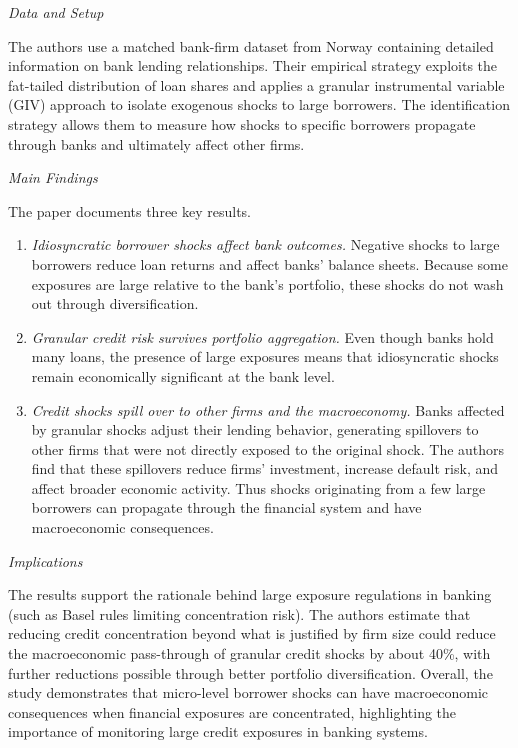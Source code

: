 \documentclass[letterpaper]{article}
\begin{document}
		\textit{Data and Setup}
		
		The authors use a matched bank-firm dataset from Norway containing detailed information on bank lending relationships. Their empirical strategy exploits the fat-tailed distribution of loan shares and applies a granular instrumental variable (GIV) approach to isolate exogenous shocks to large borrowers. The identification strategy allows them to measure how shocks to specific borrowers propagate through banks and ultimately affect other firms.
		
		\medskip
		
		\textit{Main Findings}
		
		The paper documents three key results.
		\begin{enumerate}
			\item \textit{Idiosyncratic borrower shocks affect bank outcomes.} Negative shocks to large borrowers reduce loan returns and affect banks' balance sheets. Because some exposures are large relative to the bank's portfolio, these shocks do not wash out through diversification.
			\item \textit{Granular credit risk survives portfolio aggregation.} Even though banks hold many loans, the presence of large exposures means that idiosyncratic shocks remain economically significant at the bank level.
			\item \textit{Credit shocks spill over to other firms and the macroeconomy.} Banks affected by granular shocks adjust their lending behavior, generating spillovers to other firms that were not directly exposed to the original shock. The authors find that these spillovers reduce firms' investment, increase default risk, and affect broader economic activity. Thus shocks originating from a few large borrowers can propagate through the financial system and have macroeconomic consequences.
		\end{enumerate}
		
		\medskip
		
		\textit{Implications}
		
		The results support the rationale behind large exposure regulations in banking (such as Basel rules limiting concentration risk). The authors estimate that reducing credit concentration beyond what is justified by firm size could reduce the macroeconomic pass-through of granular credit shocks by about 40\%, with further reductions possible through better portfolio diversification. Overall, the study demonstrates that micro-level borrower shocks can have macroeconomic consequences when financial exposures are concentrated, highlighting the importance of monitoring large credit exposures in banking systems.
		
\end{document}
